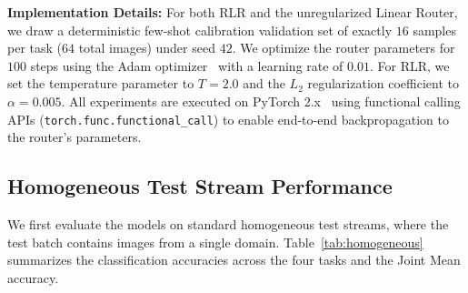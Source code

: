 \textbf{Implementation Details:} For both RLR and the unregularized Linear Router, we draw a deterministic few-shot calibration validation set of exactly $16$ samples per task ($64$ total images) under seed $42$. We optimize the router parameters for $100$ steps using the Adam optimizer~\cite{Kingma2015} with a learning rate of $0.01$. For RLR, we set the temperature parameter to $T=2.0$ and the $L_2$ regularization coefficient to $\alpha=0.005$. All experiments are executed on PyTorch 2.x~\cite{Paszke2019} using functional calling APIs (\texttt{torch.func.functional\_call}) to enable end-to-end backpropagation to the router's parameters.

\subsection{Homogeneous Test Stream Performance}

We first evaluate the models on standard homogeneous test streams, where the test batch contains images from a single domain. Table~\ref{tab:homogeneous} summarizes the classification accuracies across the four tasks and the Joint Mean accuracy.

